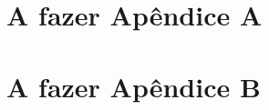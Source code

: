 \begin{apendicesenv}

\partapendices

\chapter{A fazer Apêndice A}



\chapter{A fazer Apêndice B}


\end{apendicesenv}
